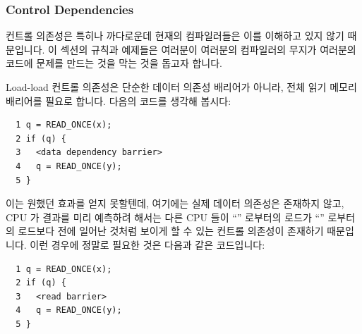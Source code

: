 \begin{enumerate}
\subsubsection{Control Dependencies}
\label{sec:advsync:Control Dependencies}

컨트롤 의존성은 특히나 까다로운데 현재의 컴파일러들은 이를 이해하고 있지 않기
때문입니다.
이 섹션의 규칙과 예제들은 여러분이 여러분의 컴파일러의 무지가 여러분의 코드에
문제를 만드는 것을 막는 것을 돕고자 합니다.

Load-load 컨트롤 의존성은 단순한 데이터 의존성 배리어가 아니라, 전체 읽기
메모리 배리어를 필요로 합니다.
다음의 코드를 생각해 봅시다:

\vspace{5pt}
\begin{minipage}[t]{\columnwidth}
\scriptsize
\begin{verbatim}
  1 q = READ_ONCE(x);
  2 if (q) {
  3   <data dependency barrier>
  4   q = READ_ONCE(y);
  5 }
\end{verbatim}
\end{minipage}
\vspace{5pt}

이는 원했던 효과를 얻지 못할텐데, 여기에는 실제 데이터 의존성은 존재하지 않고,
CPU 가 결과를 미리 예측하려 해서는 다른 CPU 들이 ``'' 로부터의 로드가
``'' 로부터의 로드보다 전에 일어난 것처럼 보이게 할 수 있는 컨트롤
의존성이 존재하기 때문입니다.
이런 경우에 정말로 필요한 것은 다음과 같은 코드입니다:

\vspace{5pt}
\begin{minipage}[t]{\columnwidth}
\scriptsize
\begin{verbatim}
  1 q = READ_ONCE(x);
  2 if (q) {
  3   <read barrier>
  4   q = READ_ONCE(y);
  5 }
\end{verbatim}
\end{minipage}
\vspace{5pt}


\end{enumerate}
